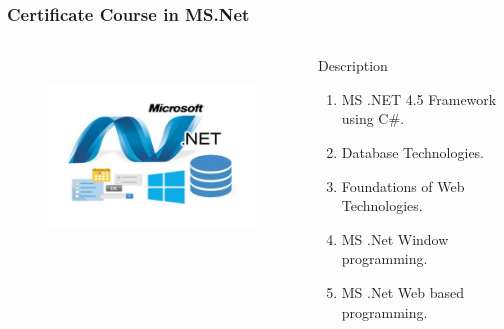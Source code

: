 \begin{frame}
	\frametitle{Certificate Course in MS.Net}
	\begin{columns}
	
	\begin{figure}
		\includegraphics[width=200pt,height=150pt]{figures/course_msnet.jpg}
	\end{figure}
	
	
	\begin{block}{Description}
		
		\begin{enumerate}
			\item MS .NET 4.5 Framework using C\#.
			\item Database Technologies.
			\item Foundations of Web Technologies.
			\item MS .Net Window programming.
			\item MS .Net Web based programming.
		\end{enumerate}
		
	\end{block}
	
\end{columns}
\end{frame}

